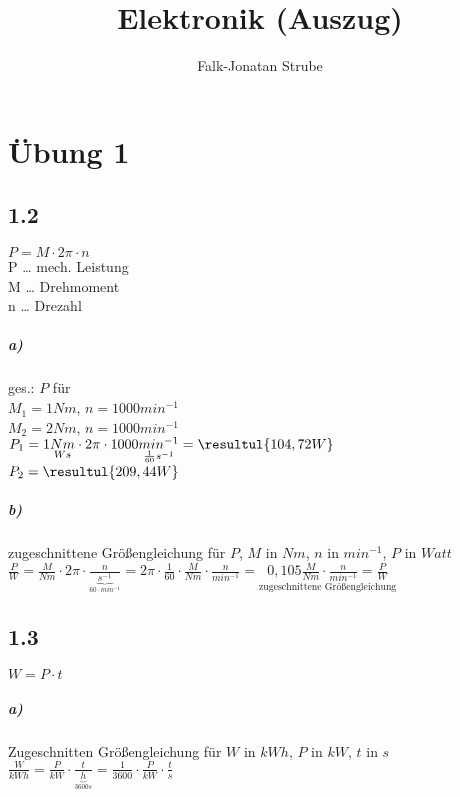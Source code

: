 \documentclass{scrreprt}
\title{Elektronik (Auszug)}
\author{Falk-Jonatan Strube}
\begin{document}
\maketitle
\tableofcontents

\chapter{Übung 1}

\section*{1.2}

$\boxed{P=M\cdot 2\pi \cdot n}$\\
P … mech. Leistung\\
M … Drehmoment\\
n … Drezahl
\paragraph{a)} ges.: $P$ für\\
$M_1= 1Nm$, $n=1000 min^{-1}$\\
$M_2= 2Nm$, $n=1000 min^{-1}$\vspace*{1em}\\
$P_1=1\underset{Ws}{Nm} \cdot 2\pi \cdot 1000 \underset{\frac{1}{60}s^{-1}}{min^{-1}}=\resultul{104,72W}$\\
$P_2=\resultul{209,44W}$

\paragraph{b)} zugeschnittene Größengleichung für $P$, $M$ in $Nm$, $n$ in $min^{-1}$, $P$ in $Watt$\\
$\frac{P}{W}=\frac{M}{Nm} \cdot 2 \pi \cdot \frac{n}{\underbrace{s^{-1}}_{60\cdot min^{-1}}}=2\pi \cdot \frac{1}{60} \cdot \frac{M}{Nm} \cdot \frac{n}{min^{-1}}=\underset{\text{zugeschnittene Größengleichung}}{\boxed{0,105\frac{M}{Nm}\cdot \frac{n}{min^{-1}}=\frac{P}{W}}}$

\section*{1.3}
$\boxed{W=P\cdot t}$
\paragraph{a)} Zugeschnitten Größengleichung für $W$ in $kWh$, $P$ in $kW$, $t$ in $s$\\
$\frac{W}{kWh}=\frac{P}{kW}\cdot \frac{t}{\underbrace{h}_{3600s}}=\frac{1}{3600}\cdot \frac{P}{kW} \cdot \frac{t}{s}$
\end{document}
